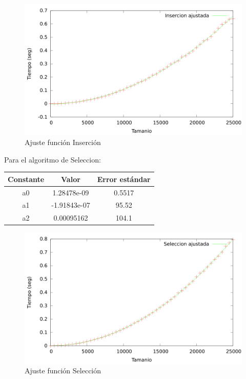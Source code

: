 \documentclass{article}
\begin{document}
	\begin{figure}[h]
		\centering
		\includegraphics[totalheight=8cm]{img/Insercion_ajustada}
		\caption{Ajuste función Inserción}
		\label{fig:Insercion_ajustada}
	\end{figure}

	Para el algoritmo de Seleccion:

	\begin{longtable}{|c|c|c|}
		\hline
		Constante		& Valor			& Error estándar	\\ \hline
		a0              & 1.28478e-09	& 0.5517 \\ \hline
		a1              & -1.91843e-07	& 95.52 \\ \hline
		a2              & 0.00095162	& 104.1 \\ \hline
	\end{longtable}

	\begin{figure}[h]
		\centering
		\includegraphics[totalheight=8cm]{img/Seleccion_ajustada}
		\caption{Ajuste función Selección}
		\label{fig:Seleccion_ajustada}
	\end{figure}
	
\end{document}
